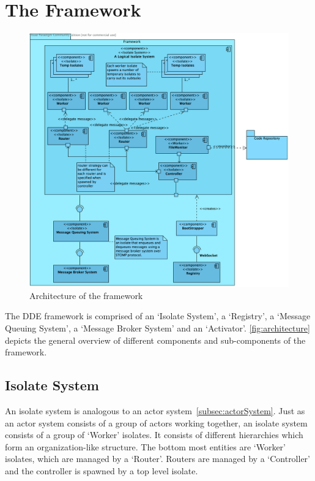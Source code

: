\section{The Framework}
\begin{figure}[H]
  \centering
  \includegraphics[width=1\textwidth]{figures/componentDiagram}
  \caption[Architecture of the framework]{Architecture of the framework}
  \label{fig:architecture}
\end{figure}

The DDE framework is comprised of an ‘Isolate System’, a ‘Registry’, a ‘Message Queuing System’, a ‘Message Broker System’ and an ‘Activator’. \autoref{fig:architecture} depicts the general overview of different components and sub-components of the framework.

  \subsection{Isolate System}
  \label{sub:isolate-system}
  An isolate system is analogous to an actor system~\autoref{subsec:actorSystem}. Just as an actor system consists of a group of actors working together, an isolate system consists of a group of ‘Worker’ isolates. It consists of different hierarchies which form an organization-like structure. The bottom most entities are ‘Worker’ isolates, which are managed by a ‘Router’. Routers are managed by a ‘Controller’ and the controller is spawned by a top level isolate.

